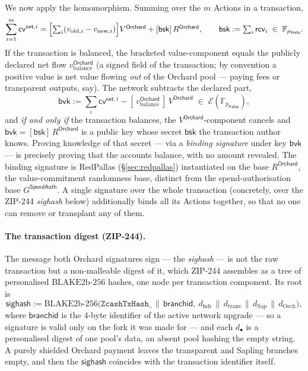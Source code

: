 \documentclass[11pt,a4paper]{article}
\theoremstyle{definition}
\newcommand{\F}{\mathbb{F}}
\newcommand{\cvsym}{\mathsf{cv}}
\newcommand{\Pallas}{\ensuremath{\mathsf{Pallas}}}
\newcommand{\Vesta}{\ensuremath{\mathsf{Vesta}}}
\newcommand{\Ep}{\ensuremath{\mathcal{E}}}
\newcommand{\rcv}{\ensuremath{\mathsf{rcv}}}
\begin{document}
We now apply the homomorphism. Summing over the $m$ Actions in a transaction,
\[
\sum_{i=1}^{m} \cvsym^{\mathsf{net},i} = \Bigl[\textstyle\sum_i (v_{\mathrm{old},i} - v_{\mathrm{new},i})\Bigr] V^{\mathsf{Orchard}} + [\mathsf{bsk}]\,R^{\mathsf{Orchard}}, \qquad \mathsf{bsk} := \sum_i \rcv_i \;\in\; \F_{p_{\Vesta}}.
\]
If the transaction is balanced, the bracketed value-component equals the
publicly declared net flow $v_{\mathrm{balance}}^{\mathsf{Orchard}}$ (a
signed field of the transaction; by convention a positive value is net value
flowing \emph{out} of the Orchard pool --- paying fees or transparent
outputs, say).
The network subtracts the declared part,
\[
\mathsf{bvk} := \sum_i \cvsym^{\mathsf{net},i} - [\,v_{\mathrm{balance}}^{\mathsf{Orchard}}\,]\,V^{\mathsf{Orchard}} \;\in\; \Ep(\F_{p_{\Pallas}}),
\]
and \emph{if and only if} the transaction balances, the
$V^{\mathsf{Orchard}}$-component cancels and $\mathsf{bvk} = [\mathsf{bsk}]\,
R^{\mathsf{Orchard}}$ is a public key whose secret $\mathsf{bsk}$ the
transaction author knows. Proving knowledge of that secret --- via a
\emph{binding signature} under key $\mathsf{bvk}$ --- is precisely
proving that the accounts balance, with no amount revealed. The binding
signature is RedPallas (\S\ref{sec:redpallas}) instantiated on the base
$R^{\mathsf{Orchard}}$, the value-commitment randomness base, distinct from
the spend-authorisation base $G^{\mathsf{SpendAuth}}$. A single signature
over the whole transaction (concretely, over the ZIP-244 \emph{sighash} below)
additionally binds all its Actions together, so that
no one can remove or transplant any of them.

\paragraph{The transaction digest (ZIP-244).} The message both Orchard
signatures sign --- the \emph{sighash} --- is not the raw transaction but a
non-malleable digest of it, which ZIP-244 assembles as a tree of personalised
$\mathrm{BLAKE2b\text{-}256}$ hashes, one node per transaction component. Its
root is
\[
\mathsf{sighash} := \mathrm{BLAKE2b\text{-}256}\bigl(\texttt{ZcashTxHash\_} \,\|\, \mathsf{branchid},\ d_{\mathrm{hdr}} \,\|\, d_{\mathrm{trans}} \,\|\, d_{\mathrm{Sap}} \,\|\, d_{\mathrm{Orch}}\bigr),
\]
where $\mathsf{branchid}$ is the $4$-byte identifier of the active network
upgrade --- so a signature is valid only on the fork it was made for --- and
each $d_\bullet$ is a personalised digest of one pool's data, an absent pool
hashing the empty string. A purely shielded Orchard payment leaves the
transparent and Sapling branches empty, and then the $\mathsf{sighash}$
coincides with the transaction identifier itself.
\end{document}
